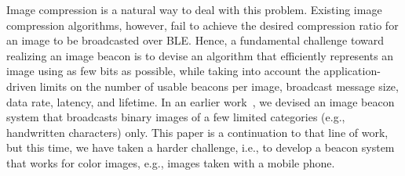 Image compression is a natural way to deal with this problem. Existing image compression algorithms, however, fail to achieve the desired compression ratio for an image to be broadcasted over BLE. Hence, a fundamental challenge toward realizing an image beacon is to devise an algorithm that efficiently represents an image using as few bits as possible, while taking into account the application-driven limits on the number of usable beacons per image, broadcast message size, data rate, latency, and lifetime. In an earlier work~\cite{shaoyears}, we devised an image beacon system that broadcasts binary images of a few limited categories (e.g., handwritten characters) only. This paper is a continuation to that line of work, but this time, we have taken a harder challenge, i.e., to develop a beacon system that works for color images, e.g., images taken with a mobile phone.





